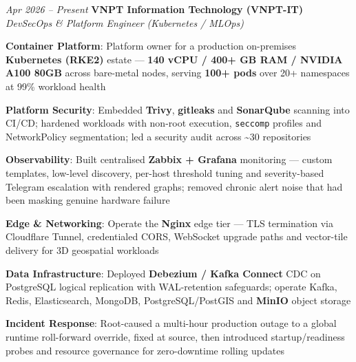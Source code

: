 \begin{twocolentry}{\textit{Apr 2026 -- Present}}
    \textbf{VNPT Information Technology (VNPT-IT)} \\[4pt]
    \textit{DevSecOps \& Platform Engineer (Kubernetes / MLOps)}
\end{twocolentry}
\begin{onecolentry}
    \begin{highlights}
        \item \textbf{Container Platform}: Platform owner for a production on-premises \textbf{Kubernetes (RKE2)} estate --- \textbf{140 vCPU / 400+ GB RAM / NVIDIA A100 80GB} across bare-metal nodes, serving \textbf{100+ pods} over 20+ namespaces at 99\% workload health
        \item \textbf{Platform Security}: Embedded \textbf{Trivy}, \textbf{gitleaks} and \textbf{SonarQube} scanning into CI/CD; hardened workloads with non-root execution, \texttt{seccomp} profiles and NetworkPolicy segmentation; led a security audit across \textasciitilde30 repositories
        \item \textbf{Observability}: Built centralised \textbf{Zabbix + Grafana} monitoring --- custom templates, low-level discovery, per-host threshold tuning and severity-based Telegram escalation with rendered graphs; removed chronic alert noise that had been masking genuine hardware failure
        \item \textbf{Edge \& Networking}: Operate the \textbf{Nginx} edge tier --- TLS termination via Cloudflare Tunnel, credentialed CORS, WebSocket upgrade paths and vector-tile delivery for 3D geospatial workloads
        \item \textbf{Data Infrastructure}: Deployed \textbf{Debezium / Kafka Connect} CDC on PostgreSQL logical replication with WAL-retention safeguards; operate Kafka, Redis, Elasticsearch, MongoDB, PostgreSQL/PostGIS and \textbf{MinIO} object storage
        \item \textbf{Incident Response}: Root-caused a multi-hour production outage to a global runtime roll-forward override, fixed at source, then introduced startup/readiness probes and resource governance for zero-downtime rolling updates
    \end{highlights}
\end{onecolentry}
\vspace{0.2 cm}

